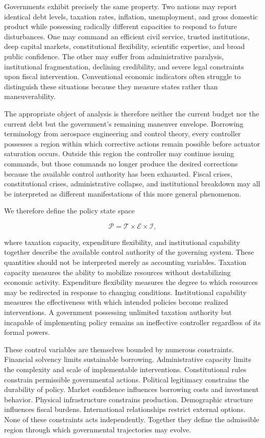\documentclass[12pt,a4paper]{article}
\begin{document}
Governments exhibit precisely the same property. Two nations may report identical debt levels, taxation rates, inflation, unemployment, and gross domestic product while possessing radically different capacities to respond to future disturbances. One may command an efficient civil service, trusted institutions, deep capital markets, constitutional flexibility, scientific expertise, and broad public confidence. The other may suffer from administrative paralysis, institutional fragmentation, declining credibility, and severe legal constraints upon fiscal intervention. Conventional economic indicators often struggle to distinguish these situations because they measure states rather than maneuverability.

The appropriate object of analysis is therefore neither the current budget nor the current debt but the government's remaining maneuver envelope. Borrowing terminology from aerospace engineering and control theory, every controller possesses a region within which corrective actions remain possible before actuator saturation occurs. Outside this region the controller may continue issuing commands, but those commands no longer produce the desired corrections because the available control authority has been exhausted. Fiscal crises, constitutional crises, administrative collapse, and institutional breakdown may all be interpreted as different manifestations of this more general phenomenon.

We therefore define the policy state space

\[
\mathcal{P}
=
\mathcal{T}
\times
\mathcal{E}
\times
\mathcal{I},
\]

where taxation capacity, expenditure flexibility, and institutional capability together describe the available control authority of the governing system. These quantities should not be interpreted merely as accounting variables. Taxation capacity measures the ability to mobilize resources without destabilizing economic activity. Expenditure flexibility measures the degree to which resources may be redirected in response to changing conditions. Institutional capability measures the effectiveness with which intended policies become realized interventions. A government possessing unlimited taxation authority but incapable of implementing policy remains an ineffective controller regardless of its formal powers.

These control variables are themselves bounded by numerous constraints. Financial solvency limits sustainable borrowing. Administrative capacity limits the complexity and scale of implementable interventions. Constitutional rules constrain permissible governmental actions. Political legitimacy constrains the durability of policy. Market confidence influences borrowing costs and investment behavior. Physical infrastructure constrains production. Demographic structure influences fiscal burdens. International relationships restrict external options. None of these constraints acts independently. Together they define the admissible region through which governmental trajectories may evolve.
\end{document}
